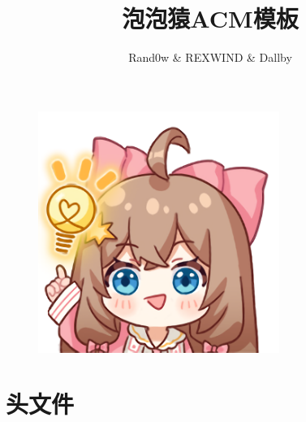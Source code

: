 \documentclass[a4]{ctexart}
\title{\CJKfamily{hei} \bfseries 泡泡猿ACM模板}
\author{Rand0w \& REXWIND \& Dallby}
\begin{document}
\small
\begin{titlepage}
\maketitle
\begin{figure}[H] %
\centering %
\includegraphics[width=0.7\textwidth]{1.png } %
\end{figure}
\end{titlepage}

 
\pagestyle{empty}
\renewcommand{\contentsname}{目录}
\tableofcontents
 \clearpage
 
\pagestyle{fancy}
\setcounter{page}{1}   %

\section{头文件}
\end{document}
